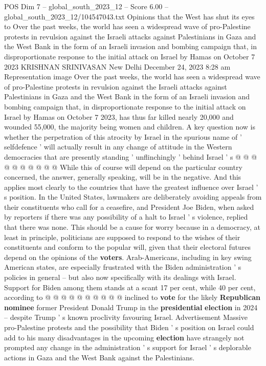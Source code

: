 \begin{textsample}{POS Dim 7 – global\_south\_2023\_12 – Score 6.00 – global\_south\_2023\_12/104547043.txt}  \label{ex:f7_pos_259}
Opinions that the West has shut its eyes to Over the past weeks, the world has seen a widespread wave of pro-Palestine protests in revulsion against the Israeli attacks against Palestinians in Gaza and the West Bank in the form of an Israeli invasion and bombing campaign that, in disproportionate response to the initial attack on Israel by Hamas on October 7 2023 KRISHNAN SRINIVASAN New Delhi December 24, 2023 8:28 am Representation image Over the past weeks, the world has seen a widespread wave of pro-Palestine protests in revulsion against the Israeli attacks against Palestinians in Gaza and the West Bank in the form of an Israeli invasion and bombing campaign that, in disproportionate response to the initial attack on Israel by Hamas on October 7 2023, has thus far killed nearly 20,000 and wounded 55,000, the majority being women and children.
A key question now is whether the perpetration of this atrocity by Israel in the spurious name of ' selfdefence ' will actually result in any change of attitude in the Western democracies that are presently standing ' unflinchingly ' behind Israel ' s @ @ @ @ @ @ @ @ @ @ While this of course will depend on the particular country concerned, the answer, generally speaking, will be in the negative.
And this applies most clearly to the countries that have the greatest influence over Israel ' s position.
In the United States, lawmakers are deliberately avoiding appeals from their constituents who call for a ceasefire, and President Joe Biden, when asked by reporters if there was any possibility of a halt to Israel ' s violence, replied that there was none.
This should be a cause for worry because in a democracy, at least in principle, politicians are supposed to respond to the wishes of their constituents and conform to the popular will, given that their electoral futures depend on the opinions of the \textbf{voters}.
Arab-Americans, including in key swing American states, are especially frustrated with the Biden administration ' s policies in general -- but also now specifically with its dealings with Israel.
Support for Biden among them stands at a scant 17 per cent, while 40 per cent, according to @ @ @ @ @ @ @ @ @ @ inclined to \textbf{vote} for the likely \textbf{Republican} \textbf{nominee} former President Donald Trump in the \textbf{presidential} \textbf{election} in 2024 -- despite Trump ' s known proclivity favouring Israel.
Advertisement Massive pro-Palestine protests and the possibility that Biden ' s position on Israel could add to his many disadvantages in the upcoming \textbf{election} have strangely not prompted any change in the administration ' s support for Israel ' s deplorable actions in Gaza and the West Bank against the Palestinians.

\end{textsample}
